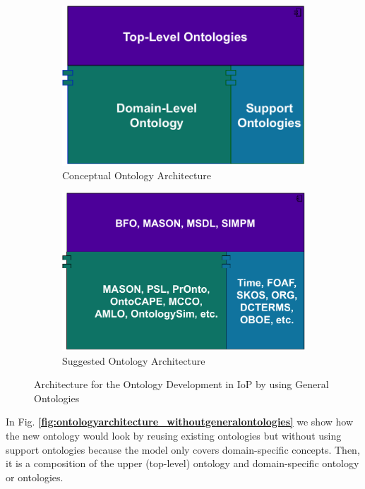 \documentclass{guideline/sty/rapport}
\begin{document}
\begin{figure}[H]
    \begin{subfigure}[t]{0.45\textwidth}
        \includegraphics[width=\textwidth,]{images/abstractarchitecture.pdf}
        \caption{Conceptual Ontology Architecture}
        \label{fig:abstractarchitecture}
    \end{subfigure}
    \hfill
    \begin{subfigure}[t]{0.45\textwidth}
        \includegraphics[width=\textwidth]{images/suggestedarchitecture.pdf}
        \caption{Suggested Ontology Architecture}
        \label{fig:suggestedarchitecture}
    \end{subfigure}
    \caption{Architecture for the Ontology Development in IoP by using General Ontologies}
    \label{fig:ontologyarchitecture}
\end{figure}

In Fig. \textbf{\ref{fig:ontologyarchitecture_withoutgeneralontologies}} we show how the new ontology would look by reusing existing ontologies but without using support ontologies because the model only covers domain-specific concepts. Then, it is a composition of the upper (top-level) ontology and domain-specific ontology or ontologies.
\end{document}
